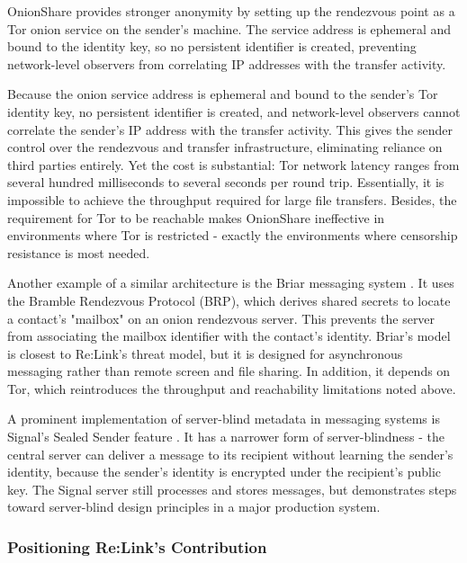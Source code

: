 \documentclass[12pt,a4paper]{article}
\begin{document}
OnionShare \cite{onionshare} provides stronger anonymity by setting up the rendezvous point as a Tor onion service on the sender’s machine. The service address is ephemeral and bound to the identity key, so no persistent identifier is created, preventing network-level observers from correlating IP addresses with the transfer activity.

Because the onion service address is ephemeral and bound to the sender’s Tor identity key, no persistent identifier is created, and network-level observers cannot correlate the sender’s IP address with the transfer activity. This gives the sender control over the rendezvous and transfer infrastructure, eliminating reliance on third parties entirely. Yet the cost is substantial: Tor network latency ranges from several hundred milliseconds to several seconds per round trip. Essentially, it is impossible to achieve the throughput required for large file transfers. Besides, the requirement for Tor to be reachable makes OnionShare ineffective in environments where Tor is restricted - exactly the environments where censorship resistance is most needed.

Another example of a similar architecture is the Briar messaging system \cite{briar}. It uses the Bramble Rendezvous Protocol (BRP), which derives shared secrets to locate a contact’s "mailbox" on an onion rendezvous server. This prevents the server from associating the mailbox identifier with the contact’s identity. Briar’s model is closest to Re:Link’s threat model, but it is designed for asynchronous messaging rather than remote screen and file sharing. In addition, it depends on Tor, which reintroduces the throughput and reachability limitations noted above.

A prominent implementation of server-blind metadata in messaging systems is Signal’s Sealed Sender feature \cite{signalsealed}. It has a narrower form of server-blindness - the central server can deliver a message to its recipient without learning the sender’s identity, because the sender’s identity is encrypted under the recipient’s public key. The Signal server still processes and stores messages, but demonstrates steps toward server-blind design principles in a major production system.

\subsubsection{Positioning Re:Link’s Contribution}
\end{document}
